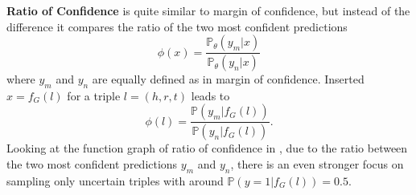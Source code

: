 \textbf{Ratio of Confidence}
is quite similar to margin of confidence, but instead of the difference it compares the ratio of the two most confident predictions
\begin{equation}
    \phi(x) = \frac{\mathds{P}_{\theta}(y_m | x)}{\mathds{P}_{\theta}(y_n |x)}
\end{equation}
where $y_m$ and $y_n$ are equally defined as in margin of confidence.
Inserted $x = f_G(l)$ for a triple $l = (h,r,t)$ leads to
\begin{equation}
    \phi(l) = \frac{\mathds{P}(y_m |  f_G(l))}{\mathds{P}(y_n |f_G(l))}.
\end{equation}
Looking at the function graph of ratio of confidence in , due to the ratio between the two most confident predictions $y_m$ and $y_n$, there is an even stronger focus on sampling only uncertain triples with \ussoftmax around $\mathds{P}(y = 1 | f_G(l)) = 0.5$.